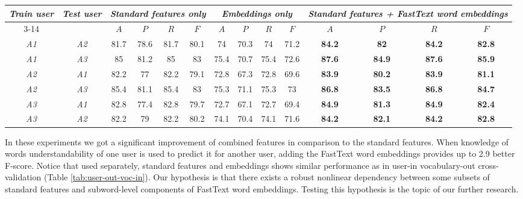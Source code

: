 \begin{table*}[h]
\begin{tabular}{cc|cccc|cccc|cccc}
\multirow{2}{0.6cm}{\textit{Train user}} & \multirow{2}{0.6cm}{\textit{Test user}} & \multicolumn{4}{c|}{\textit{Standard features only}} & \multicolumn{4}{c|}{\textit{Embeddings only}} & \multicolumn{4}{X}{\textit{Standard features + FastText word embeddings}} \\ \cline{3-14} 
 &  & $A$ & $P$ & $R$ & $F$ & $A$ & $P$ & $R$ & $F$ & $A$ & $P$ & $R$ & $F$ \\ \hline
\textit{A1} & \textit{A2} & 81.7 & 78.6 & 81.7 & 80.1 & 74 & 70.3 & 74 & 71.2 & \textbf{84.2} & \textbf{82} & \textbf{84.2} & \textbf{82.8} \\  
\textit{A1} & \textit{A3} & 85 & 81.2 & 85 & 83 & 75.4 & 70.7 & 75.4 & 72.6 & \textbf{87.6} & \textbf{84.9} & \textbf{87.6} & \textbf{85.9} \\ \hline 
\textit{A2} & \textit{A1} & 82.2 & 77 & 82.2 & 79.1 & 72.8 & 67.3 & 72.8 & 69.6 & \textbf{83.9} & \textbf{80.2} & \textbf{83.9} & \textbf{81.1} \\  
\textit{A2} & \textit{A3} & 85.4 & 81.1 & 85.4 & 83 & 75.3 & 71.1 & 75.3 & 73 & \textbf{86.8} & \textbf{83.5} & \textbf{86.8} & \textbf{84.7} \\ \hline 
\textit{A3} & \textit{A1} & 82.8 & 77.4 & 82.8 & 79.7 & 72.7 & 67.1 & 72.7 & 69.4 & \textbf{84.9} & \textbf{81.3} & \textbf{84.9} & \textbf{82.4} \\  
\textit{A3} & \textit{A2} & 82.2 & 79 & 82.2 & 80.2 & 74.1 & 70.4 & 74.1 & 71.6 & \textbf{84.2} & \textbf{82.1} & \textbf{84.2} & \textbf{82.8} \\ \hline 
\end{tabular}
    \caption{Experiments on user-out vocabulary-in cross-validation}
    \label{tab:user-out-voc-in}
\end{table*}


In these experiments we got a significant improvement of combined features in comparison to the standard features. When knowledge of words understandability of one user is used to predict it for another user, adding the FastText word embeddings provides up to 2.9 better F-score. Notice that used separately, standard features and embeddings shows similar performance as in user-in vocabulary-out cross-validation (Table \ref{tab:user-out-voc-in}). Our hypothesis is that there exists a robust nonlinear dependency between some subsets of standard features and subword-level components of FastText word embeddings. Testing this hypothesis is the topic of our further research.

